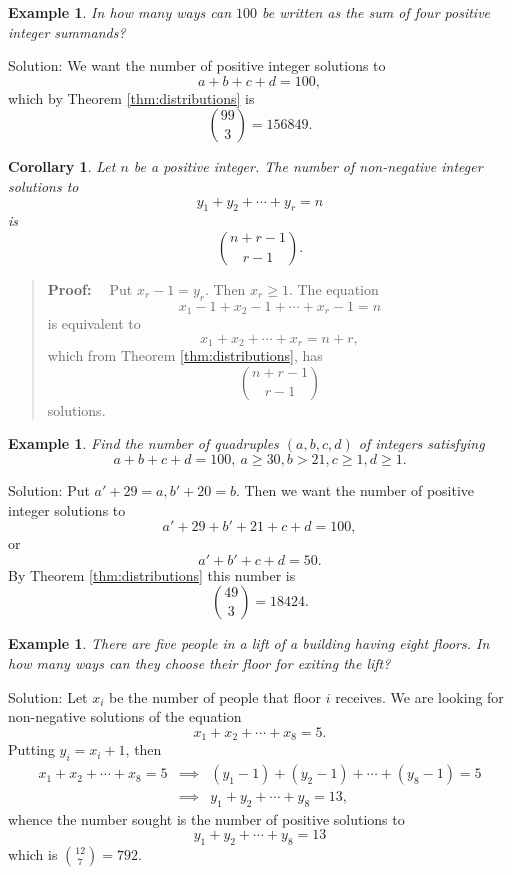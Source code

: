\documentclass[11pt, openany]{book}
\theoremstyle{change} \theoremheaderfont{\blue\sffamily\bfseries}
\newtheorem{cor}[thm]{Corollary}
\newtheorem{exa}[thm]{Example}
\newcommand{\proofsymbol}{\Pisymbol{pzd}{113}}
\theoremstyle{nonumberplain} \theoremheaderfont{\sffamily\bfseries}
\newenvironment{pf}[0]{\itshape\begin{quote}{\bf Proof: \ }}{\proofsymbol\end{quote}}
\def\binom#1#2{{#1\choose#2}}
\newcommand{\í}{\'{\i}}
\begin{document}
\begin{exa}
In how many ways can $100$ be written as the sum of four positive
integer summands?
\end{exa}
Solution: We want the number of positive integer solutions to
$$a + b + c + d = 100,$$ which by Theorem \ref{thm:distributions}
is $$\binom{99}{3} = 156849.$$


\begin{cor}
Let $n$ be a positive integer. The number of non-negative integer
solutions to
$$y_1 + y_2 + \cdots + y_r = n$$is
$$\binom{n + r - 1}{r - 1}.$$
\end{cor}
\begin{pf}
Put $x_r - 1 = y_r$. Then $x_r \geq 1$. The equation
$$x_1 - 1 + x_2 - 1 + \cdots + x_r - 1 = n$$is equivalent to
$$x_1 + x_2 + \cdots + x_r = n + r,$$which from Theorem
\ref{thm:distributions}, has $$\binom{n + r - 1}{r - 1}$$solutions.
\end{pf}

\begin{exa}Find the number of quadruples $(a, b, c, d)$ of
integers satisfying
$$a + b + c + d  = 100, \ a \geq 30, b > 21, c \geq 1, d \geq 1.$$\end{exa}
Solution: Put $a' + 29 = a, b' +  20 = b.$ Then we want the number
of positive integer solutions to
$$a' + 29 + b' + 21 + c + d = 100,$$ or
$$a' + b' + c + d = 50.$$
By Theorem \ref{thm:distributions} this number is
$$\binom{49}{3} = 18424.$$
\begin{exa}
There are five people in a lift of a building having eight floors.
In how many ways can they choose their floor for exiting the lift?
\end{exa}
Solution: Let $x_i$ be the number of people that floor $i$ receives.
We are looking for non-negative solutions of the equation $$x_1 +
x_2 + \cdots + x_8 = 5.   $$ Putting $y_i = x_i + 1$, then
 $$\begin{array}{lll}x_1 + x_2 + \cdots + x_8 = 5  & \implies &    (y_1-1) + (y_2-1) + \cdots + (y_8-1) = 5\\ & \implies &  y_1 + y_2 + \cdots + y_8 = 13, \end{array}  $$
whence the number sought is the number of positive solutions to
$$ y_1 + y_2 + \cdots + y_8 = 13        $$ which is $\binom{12}{7} = 792.$
\end{document}
